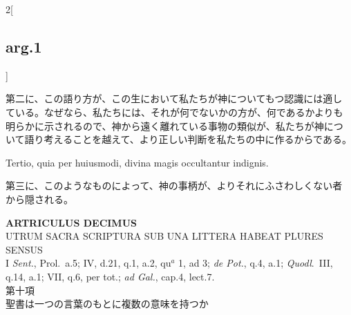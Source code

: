\documentclass[
paper=a4paper,
fontsize=10pt,
jafontsize=9pt,
titlepage
]{jlreq}
\begin{document}
\begin{paracol}{2}[\subsection{arg.1}]
\switchcolumn

第二に、この語り方が、この生において私たちが神についてもつ認識には適し
ている。なぜなら、私たちには、それが何でないかの方が、何であるかよりも
明らかに示されるので、神から遠く離れている事物の類似が、私たちが神につ
いて語り考えることを越えて、より正しい判断を私たちの中に作るからである。

\switchcolumn*

Tertio, quia per huiusmodi, divina magis occultantur indignis.

\switchcolumn

第三に、このようなものによって、神の事柄が、よりそれにふさわしくない者
から隠される。

\end{paracol}
\newpage






{}
\setcounter{section}{10}
\setcounter{subsection}{0}
\begin{center}
 {\Large {\bfseries ARTRICULUS DECIMUS}}\\
 {\large UTRUM SACRA SCRIPTURA SUB UNA LITTERA HABEAT PLURES SENSUS}\\
 {\footnotesize I {\itshape Sent.}, Prol.~a.5; IV, d.21, q.1, a.2, qu$^a$ 1, ad 3; {\itshape de Pot.}, q.4, a.1; {\itshape Quodl}.~III, q.14, a.1; VII, q.6, per tot.; {\itshape ad Gal.}, cap.4, lect.7.}\\
 {\Large 第十項\\聖書は一つの言葉のもとに複数の意味を持つか}
\end{center}
\end{document}
